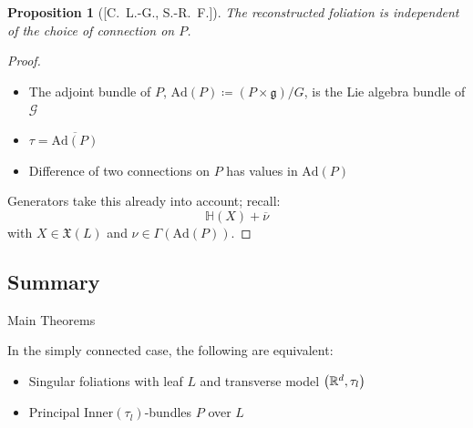 \documentclass[
aspectratio=3218, 
10pt
]{beamer}
\def\bes{\begin{equation*}}
\def\ees{\end{equation*}}
\theoremstyle{plain}
\newtheorem{proposition}[theorem]{Proposition}
\theoremstyle{remark}
\begin{document}
{\begin{frame}
\begin{proposition}[{[C.\ L.-G., S.-R.\ F.]}]\vspace{.5pt}
The reconstructed foliation is independent of the choice of connection on $P$.
\end{proposition}
\pause
\begin{proof}
\begin{itemize}
	\item The adjoint bundle of $P$, $\mathup{Ad}(P) \coloneqq (P \times \mathfrak{g})/G$, is the Lie algebra bundle of $\mathcal{G}$
	\item $\tau = \overline{\mathup{Ad}(P)}$
	\item Difference of two connections on $P$ has values in $\mathup{Ad}(P)$
\end{itemize}
Generators take this already into account; recall:
\bes
\mathbb{H}(X) + \overline{\nu}
\ees
with $X \in \mathfrak{X}(L)$ and $\nu \in \Gamma(\mathup{Ad}(P))$.
\end{proof}
\end{frame}

\subsection{Summary}

\begin{frame}{Main Theorems}
\begin{theorem}[{[C.\ L.-G., S.-R.\ F.]}]\vspace{.5pt}
In the simply connected case, the following are equivalent:
\begin{itemize}
	\item Singular foliations with leaf $L$ and transverse model $\mleft(\mathbb{R}^d, \tau_l\mright)$
	\item Principal $\mathrm{Inner}(\tau_l)$-bundles $P$ over $L$
\end{itemize}
\end{theorem}


\end{frame}}
\end{document}
